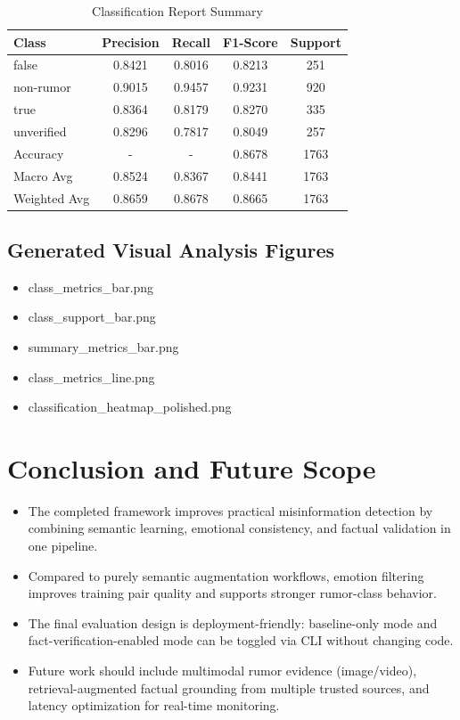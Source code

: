 \documentclass[12pt,a4paper]{report}
\begin{document}
\begin{table}[h]
\centering
\caption{Classification Report Summary}
\begin{tabular}{lcccc}
\toprule
Class & Precision & Recall & F1-Score & Support \\
\midrule
false & 0.8421 & 0.8016 & 0.8213 & 251 \\
non-rumor & 0.9015 & 0.9457 & 0.9231 & 920 \\
true & 0.8364 & 0.8179 & 0.8270 & 335 \\
unverified & 0.8296 & 0.7817 & 0.8049 & 257 \\
\midrule
Accuracy & - & - & 0.8678 & 1763 \\
Macro Avg & 0.8524 & 0.8367 & 0.8441 & 1763 \\
Weighted Avg & 0.8659 & 0.8678 & 0.8665 & 1763 \\
\bottomrule
\end{tabular}
\end{table}

\section*{Generated Visual Analysis Figures}
\begin{itemize}
\item class\_metrics\_bar.png
\item class\_support\_bar.png
\item summary\_metrics\_bar.png
\item class\_metrics\_line.png
\item classification\_heatmap\_polished.png
\end{itemize}

\chapter{Conclusion and Future Scope}
\begin{itemize}
\item The completed framework improves practical misinformation detection by combining semantic learning, emotional consistency, and factual validation in one pipeline.
\item Compared to purely semantic augmentation workflows, emotion filtering improves training pair quality and supports stronger rumor-class behavior.
\item The final evaluation design is deployment-friendly: baseline-only mode and fact-verification-enabled mode can be toggled via CLI without changing code.
\item Future work should include multimodal rumor evidence (image/video), retrieval-augmented factual grounding from multiple trusted sources, and latency optimization for real-time monitoring.
\end{itemize}
\end{document}
